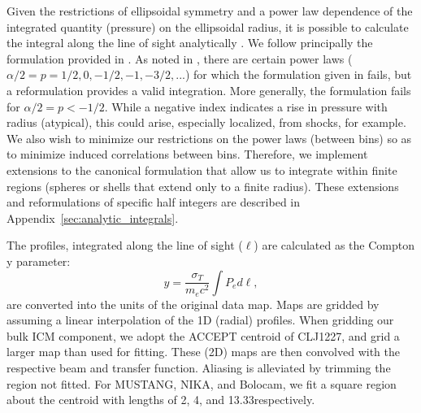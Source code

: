 \documentclass[onecolumn,traditabstract]{aa}
\begin{document}

Given the restrictions of ellipsoidal symmetry and a power law dependence of the integrated quantity (pressure) on the
ellipsoidal radius, it is possible to calculate the integral along the line of sight analytically
\citep[e.g.,][]{vikhlinin2001a,korngut2011}. We follow
principally the formulation provided in \citet{korngut2011}. As noted in \citet{sarazin2016}, there are certain power
laws ($\alpha/2 = p = 1/2, 0 , -1/2, -1, -3/2, ...$) for which the formulation given in \citet{korngut2011} fails,
but a reformulation provides a valid integration. More generally, the formulation fails for $\alpha/2 = p < -1/2$.
While a negative index indicates a rise in pressure with radius (atypical), this could arise, especially localized,
from shocks, for example. We also wish to minimize our restrictions on the power laws (between bins) so as to minimize
induced correlations between bins. Therefore, we implement extensions to the canonical formulation that allow us to
integrate within finite regions (spheres or shells that extend only to a finite radius). These extensions and
reformulations of specific half integers are described in Appendix~\ref{sec:analytic_integrals}.

The profiles, integrated along the line of sight ($\ell$) are  calculated as the Compton y parameter:
\begin{equation}
  y = \frac{\sigma_T}{m_e c^2} \int P_e d\ell,
  \label{eqn:compton_y}
\end{equation}
are converted into the units of the original data map. Maps are gridded by assuming a linear interpolation
of the 1D (radial) profiles. When gridding our bulk ICM component, we adopt the ACCEPT centroid of CLJ1227,
and grid a larger map than used for fitting.
These (2D) maps are then convolved with the respective beam and transfer function. Aliasing is alleviated by trimming
the region not fitted. For MUSTANG, NIKA, and Bolocam, we fit a square region about the centroid with lengths
of 2\amin, 4\amin, and 13.33\amin respectively.
\end{document}
